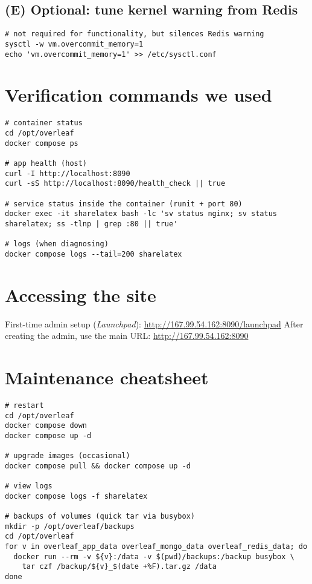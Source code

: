 \subsection{(E) Optional: tune kernel warning from Redis}
\begin{verbatim}
# not required for functionality, but silences Redis warning
sysctl -w vm.overcommit_memory=1
echo 'vm.overcommit_memory=1' >> /etc/sysctl.conf
\end{verbatim}

\section{Verification commands we used}
\begin{verbatim}
# container status
cd /opt/overleaf
docker compose ps

# app health (host)
curl -I http://localhost:8090
curl -sS http://localhost:8090/health_check || true

# service status inside the container (runit + port 80)
docker exec -it sharelatex bash -lc 'sv status nginx; sv status sharelatex; ss -tlnp | grep :80 || true'

# logs (when diagnosing)
docker compose logs --tail=200 sharelatex
\end{verbatim}

\section{Accessing the site}
First-time admin setup (\textit{Launchpad}):
\url{http://167.99.54.162:8090/launchpad}
After creating the admin, use the main URL:
\url{http://167.99.54.162:8090}

\section{Maintenance cheatsheet}
\begin{verbatim}
# restart
cd /opt/overleaf
docker compose down
docker compose up -d

# upgrade images (occasional)
docker compose pull && docker compose up -d

# view logs
docker compose logs -f sharelatex

# backups of volumes (quick tar via busybox)
mkdir -p /opt/overleaf/backups
cd /opt/overleaf
for v in overleaf_app_data overleaf_mongo_data overleaf_redis_data; do
  docker run --rm -v ${v}:/data -v $(pwd)/backups:/backup busybox \
    tar czf /backup/${v}_$(date +%F).tar.gz /data
done
\end{verbatim}

